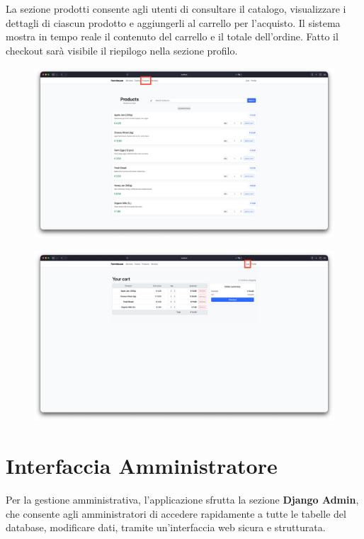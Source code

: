 \documentclass[a4paper,12pt]{report}
\begin{document}
La sezione prodotti consente agli utenti di consultare il catalogo, visualizzare i dettagli di 
ciascun prodotto e aggiungerli al carrello per l'acquisto. Il sistema mostra in tempo reale il 
contenuto del carrello e il totale dell'ordine. Fatto il checkout sarà visibile il riepilogo 
nella sezione profilo.

\begin{figure}[H]
    \centering
    \includegraphics[width=\textwidth, trim=0 0 0 0]{./img/users/products.png}
    \vspace{-1em}
    \label{fig:products}
\end{figure}

\begin{figure}[H]
    \centering
    \includegraphics[width=\textwidth, trim=0 0 0 0]{./img/users/cart.png}
    \vspace{-1em}
    \label{fig:cart}
\end{figure}


\section{Interfaccia Amministratore}
Per la gestione amministrativa, l'applicazione sfrutta la sezione \textbf{Django Admin}, 
che consente agli amministratori di accedere rapidamente a tutte le tabelle del database, 
modificare dati, tramite un'interfaccia web sicura e strutturata.
\end{document}
